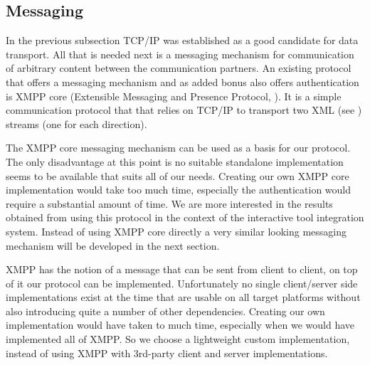 \documentclass{article}
\begin{document}

  \subsection{Messaging}

   In the previous subsection TCP/IP was established as a good candidate for
   data transport. All that is needed next is a messaging mechanism for
   communication of arbitrary content between the communication partners.  An
   existing protocol that offers a messaging mechanism and as added bonus also
   offers authentication is XMPP core (Extensible Messaging and Presence Protocol,
   \cite{rfc3920}).  It is a simple communication protocol that that relies on
   TCP/IP to transport two XML (see \cite{Sperberg-McQueen:06:EML}) streams
   (one for each direction).

   The XMPP core messaging mechanism can be used as a basis for our protocol.
   The only disadvantage at this point is no suitable standalone implementation
   seems to be available that suits all of our needs. Creating our own XMPP
   core implementation would take too much time, especially the authentication
   would require a substantial amount of time. We are more interested in the
   results obtained from using this protocol in the context of the interactive
   tool integration system. Instead of using XMPP core directly a very similar
   looking messaging mechanism will be developed in the next section.

   XMPP has the notion of a message that can be sent from client to client, on
   top of it our protocol can be implemented.   Unfortunately no single
   client/server side implementations exist at the time that are usable on all
   target platforms without also introducing quite a number of other
   dependencies. Creating our own implementation would have taken to much time,
   especially when we would have implemented all of XMPP.  So we choose a lightweight
   custom implementation, instead of using XMPP with 3rd-party client and
   server implementations.
\end{document}
